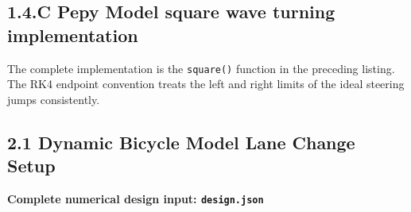\documentclass{article}
\begin{document}
\subsection{1.4.C Pepy Model square wave turning implementation}
The complete implementation is the \texttt{square()} function in the preceding listing. The RK4 endpoint convention treats the left and right limits of the ideal steering jumps consistently.
\subsection{2.1 Dynamic Bicycle Model Lane Change Setup}

\textbf{Complete numerical design input: \texttt{design.json}}

\end{document}

